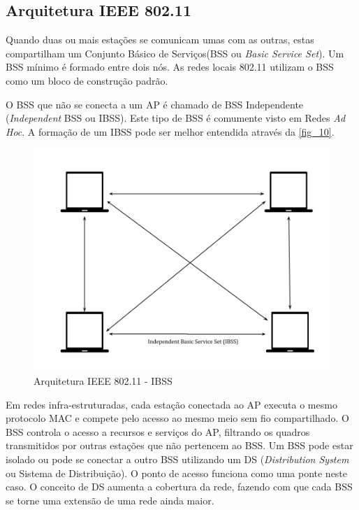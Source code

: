 \documentclass[
12pt,				%
openright,			%
oneside,			%
a4paper,			%
brazil,				%
]{abntex2}
\begin{document}
	\subsection{Arquitetura IEEE 802.11}
	
	\par Quando duas ou mais estações se comunicam umas com as outras, estas compartilham um Conjunto Básico de Serviços(BSS ou \textit{Basic Service Set}). Um BSS mínimo é formado entre dois nós. As redes locais 802.11 utilizam o BSS como um bloco de construção padrão.
	
	\par O BSS que não se conecta a um AP é chamado de BSS Independente (\textit{Independent} BSS ou IBSS). Este tipo de BSS é comumente visto em Redes \textit{Ad Hoc}. A formação de um IBSS pode ser melhor entendida através da \autoref{fig_10}.
	
	\begin{figure} [H]
		\centering
		\includegraphics[scale=.35]{figuras/cap2/10ArquiteturaIEEE80211IBSS}
		\caption{\label{fig_10}Arquitetura IEEE 802.11 - IBSS}
	\end{figure}
	
	\par Em redes infra-estruturadas, cada estação conectada ao AP executa o mesmo protocolo MAC e compete pelo acesso ao mesmo meio sem fio compartilhado. O BSS controla o acesso a recursos e serviços do AP, filtrando os quadros transmitidos por outras estações que não pertencem ao BSS. Um BSS pode estar isolado ou pode se conectar a outro BSS utilizando um DS (\textit{Distribution System} ou Sistema de Distribuição). O ponto de acesso funciona como uma ponte neste caso. O conceito de DS aumenta a cobertura da rede, fazendo com que cada BSS se torne uma extensão de uma rede ainda maior.
	
\end{document}
